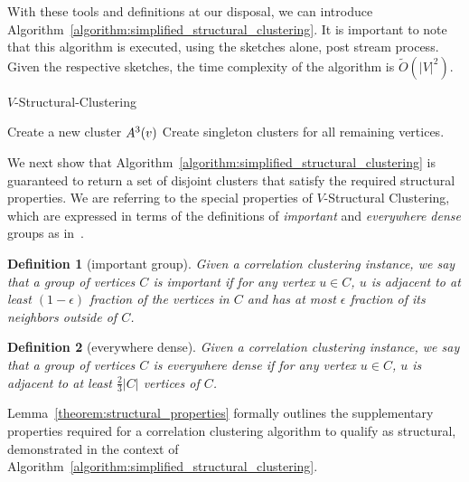 \documentclass{article}
\newtheorem{definition}{Definition}[section]
\begin{document}
With these tools and definitions at our disposal, we can introduce Algorithm~\ref{algorithm:simplified_structural_clustering}. It is important to note that this algorithm is executed, using the sketches alone, post stream process. Given the respective sketches, the time complexity of the algorithm is $\widetilde{O}(|V|^2)$.

\begin{algorithm}[H]
\caption{$V$-Structural-Clustering}
\label{algorithm:simplified_structural_clustering}
\begin{algorithmic}[1]
            \State Create a new cluster $A^3(v)$ \label{alg:cluster_creation}
        \EndIf
    \EndFor
    \State Create singleton clusters for all remaining vertices.
\end{algorithmic}
\end{algorithm}

We next show that Algorithm~\ref{algorithm:simplified_structural_clustering} is guaranteed to return a set of disjoint clusters that satisfy the required structural properties. We are referring to the special properties of $V$-Structural Clustering, which are expressed in terms of the definitions of \textit{important} and \textit{everywhere dense} groups as in~\cite{cohen2022fitting}.

\begin{definition}[important group]
\label{definition:important_group}
Given a correlation clustering instance, we say that
a group of vertices $C$ is important if for any vertex $u\in C$, $u$ is adjacent to at least $(1-\epsilon)$ fraction of the vertices in $C$ and has at most $\epsilon$ fraction of its neighbors outside of $C$.
\end{definition}

\begin{definition}[everywhere dense]
\label{definition:everywhere_dense}
Given a correlation clustering instance, we say that a group of vertices $C$ is everywhere dense if for any vertex $u\in C$, $u$ is adjacent to at least $\frac{2}{3}|C|$ vertices of $C$.
\end{definition}

Lemma~\ref{theorem:structural_properties} formally outlines the supplementary properties required for a correlation clustering algorithm to qualify as structural, demonstrated in the context of Algorithm~\ref{algorithm:simplified_structural_clustering}.
\end{document}
